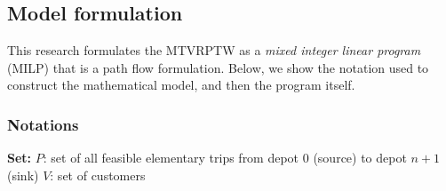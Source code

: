 \documentclass[11pt]{article}
\begin{document}


\subsection{Model formulation}
\label{sec:model}
This research formulates the MTVRPTW as a \textit{mixed integer linear program} (MILP) that is a path flow formulation.  Below, we show the notation used to construct the mathematical model, and then the program itself.

\subsubsection{Notations}
\textbf{Set:}
\newline
$P$: set of all feasible elementary trips from depot $0$ (source) to depot $n + 1$ (sink)
\newline
$V$: set of customers
\newline
\end{document}
